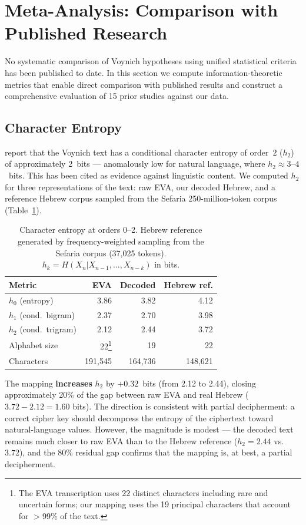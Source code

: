 \documentclass[11pt,a4paper]{article}
\begin{document}
\section{Meta-Analysis: Comparison with Published Research}
\label{sec:meta}

No systematic comparison of Voynich hypotheses using unified statistical
criteria has been published to date. In this section we compute
information-theoretic metrics that enable direct comparison with published
results and construct a comprehensive evaluation of 15 prior studies
against our data.

\subsection{Character Entropy}
\label{sec:entropy}

\citet{BowernLindemann2021} report that the Voynich text has a
conditional character entropy of order~2 ($h_2$) of approximately 2~bits
--- anomalously low for natural language, where $h_2 \approx 3$--$4$~bits.
This has been cited as evidence against linguistic content. We computed
$h_2$ for three representations of the text: raw EVA, our decoded Hebrew,
and a reference Hebrew corpus sampled from the Sefaria 250-million-token
corpus (Table~\ref{tab:entropy}).

\begin{table}[htbp]
\centering
\caption{Character entropy at orders 0--2. Hebrew reference generated by
frequency-weighted sampling from the Sefaria corpus (37,025 tokens).
$h_k = H(X_n | X_{n-1}, \ldots, X_{n-k})$ in bits.}
\label{tab:entropy}
\small
\begin{tabular}{@{}lrrr@{}}
\toprule
Metric & EVA & Decoded & Hebrew ref. \\
\midrule
$h_0$ (entropy) & 3.86 & 3.82 & 4.12 \\
$h_1$ (cond.\ bigram) & 2.37 & 2.70 & 3.98 \\
$h_2$ (cond.\ trigram) & 2.12 & 2.44 & 3.72 \\
\midrule
Alphabet size & 22\footnote{The EVA transcription uses 22 distinct characters including rare and uncertain forms; our mapping uses the 19 principal characters that account for $>$99\% of the text.} & 19 & 22 \\
Characters & 191,545 & 164,736 & 148,621 \\
\bottomrule
\end{tabular}
\end{table}

The mapping \textbf{increases} $h_2$ by $+0.32$~bits (from 2.12 to 2.44),
closing approximately 20\% of the gap between raw EVA and real Hebrew
($3.72 - 2.12 = 1.60$ bits). The direction is consistent with partial
decipherment: a correct cipher key should decompress the entropy of the
ciphertext toward natural-language values. However, the magnitude is
modest --- the decoded text remains much closer to raw EVA than to the
Hebrew reference ($h_2 = 2.44$ vs.\ $3.72$), and the 80\% residual gap
confirms that the mapping is, at best, a partial decipherment.
\end{document}
